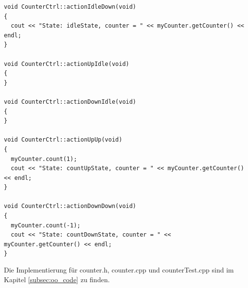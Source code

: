 \begin{lstlisting}[style=Cpp]
void CounterCtrl::actionIdleDown(void)
{
  cout << "State: idleState, counter = " << myCounter.getCounter() << endl;
}

void CounterCtrl::actionUpIdle(void)
{
}

void CounterCtrl::actionDownIdle(void)
{
}

void CounterCtrl::actionUpUp(void)
{
  myCounter.count(1);
  cout << "State: countUpState, counter = " << myCounter.getCounter() << endl;
}

void CounterCtrl::actionDownDown(void)
{
  myCounter.count(-1);
  cout << "State: countDownState, counter = " << myCounter.getCounter() << endl;
}

\end{lstlisting}

Die Implementierung für counter.h, counter.cpp und counterTest.cpp sind im Kapitel \ref{subsec:oo_code} zu finden.\\

